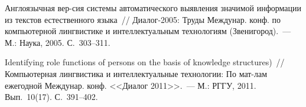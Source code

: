 \begin{multicols}{2}
{{\begin{thebibliography}{99}
     Англоязычная вер-\linebreak сия системы автоматического выявления значимой\linebreak
      информации из 
текстов естественного языка~// Диа\-лог-2005: Труды Междунар. конф. по компьютерной 
лингвистике и интеллектуальным технологиям (Звенигород).~--- М.: Наука, 2005. 
     С.~303--311.
     
    

\label{end\stat}
     
     Identifying role functions of persons on the basis of knowledge structures)~// Компьютерная 
лингвистика и интеллектуальные технологии: По мат-лам ежегодной 
Междунар. конф. <<Диалог 2011>>.~--- М.: РГГУ, 2011.  Вып.~10(17). С.~391--402.
    
 \end{thebibliography}
}
}


\end{multicols}